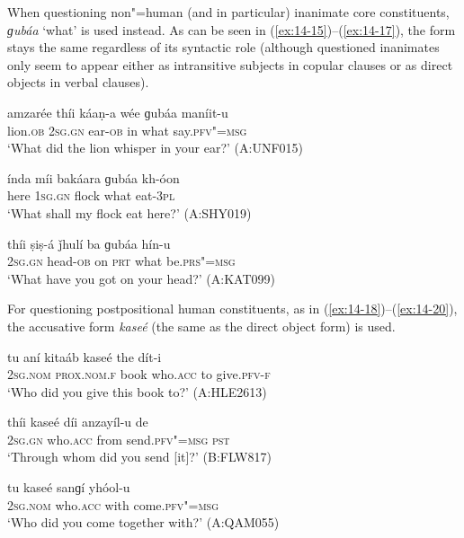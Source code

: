 When questioning non"=human (and in particular) inanimate core constituents, \textit{ɡubáa} `what' is used instead. As can be seen in (\ref{ex:14-15})--(\ref{ex:14-17}), the form stays the same regardless of its syntactic role (although questioned inanimates only seem to appear either as intransitive subjects in copular clauses or as direct objects in verbal clauses).

\begin{exe}
\ex
\label{ex:14-15}
\gll amzarée thíi káaṇ-a wée ɡubáa maníit-u \\
lion.\textsc{ob} \textsc{2sg.gn} ear-\textsc{ob} in what say.\textsc{pfv"=msg} \\
\glt `What did the lion whisper in your ear?' (A:UNF015)

\ex
\label{ex:14-16}
\gll índa míi bakáara ɡubáa kh-óon \\
here \textsc{1sg.gn} flock what eat-\textsc{3pl} \\
\glt `What shall my flock eat here?' (A:SHY019)

\ex
\label{ex:14-17}
\gll thíi ṣiṣ-á ǰhulí ba ɡubáa hín-u \\
\textsc{2sg.gn} head-\textsc{ob} on \textsc{prt} what be.\textsc{prs"=msg} \\
\glt `What have you got on your head?' (A:KAT099)
\end{exe}

 For questioning postpositional human constituents, as in (\ref{ex:14-18})--(\ref{ex:14-20}), the accusative form \textit{kaseé} (the same as the direct object form) is used.

\begin{exe}
\ex
\label{ex:14-18}
\gll tu aní kitaáb kaseé the dít-i \\
\textsc{2sg.nom} \textsc{prox.nom.f} book who.\textsc{acc} to give.\textsc{pfv-f} \\
\glt `Who did you give this book to?' (A:HLE2613)

\ex
\label{ex:14-19}
\gll thíi kaseé díi anzayíl-u de \\
\textsc{2sg.gn} who.\textsc{acc} from send.\textsc{pfv"=msg} \textsc{pst} \\
\glt `Through whom did you send [it]?' (B:FLW817)

\ex
\label{ex:14-20}
\gll tu kaseé sanɡí yhóol-u \\
\textsc{2sg.nom} who.\textsc{acc} with come.\textsc{pfv"=msg} \\
\glt `Who did you come together with?' (A:QAM055)
\end{exe}

